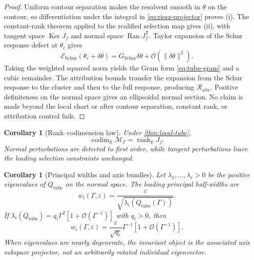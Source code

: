 \documentclass[11pt]{article}
\newtheorem{corollary}[theorem]{Corollary}
\theoremstyle{definition}
\theoremstyle{remark}
\DeclareMathOperator{\rank}{rank}
\DeclareMathOperator{\Ran}{Ran}
\DeclareMathOperator{\Ker}{Ker}
\newcommand{\eps}{\varepsilon}
\newcommand{\cM}{\mathcal M}
\newcommand{\cE}{\mathcal E}
\newcommand{\RR}{\mathbb R}
\begin{document}
\begin{proof}
Uniform contour separation makes the resolvent smooth in $\theta$ on the contour, so differentiation under the integral in \eqref{eq:riesz-projector} proves (i). The constant-rank theorem applied to the realified selection map gives (ii), with tangent space $\Ker J_f$ and normal space $\Ran J_f^{\mathsf T}$. Taylor expansion of the Schur response defect at $\theta_c$ gives
\begin{equation}
\cE_{\mathrm{Schur}}(\theta_c+\delta\theta)
=
G_{\mathrm{Schur}}\delta\theta
+\mathcal O(\|\delta\theta\|^2).
\end{equation}
Taking the weighted squared norm yields the Gram form \eqref{eq:tube-gram} and a cubic remainder. The attribution bounds transfer the expansion from the Schur response to the cluster and then to the full response, producing $\mathcal R_{\mathrm{attr}}$. Positive definiteness on the normal space gives an ellipsoidal normal section. No claim is made beyond the local chart or after contour separation, constant rank, or attribution control fails.
\end{proof}

\begin{corollary}[Rank--codimension law]\label{cor:rank-codim}
Under \cref{thm:local-tube},
\begin{equation}
\boxed{
\operatorname{codim}_{\RR}\cM_\Gamma
=
\rank_{\RR}J_f.
}
\label{eq:rank-codim}
\end{equation}
Normal perturbations are detected to first order, while tangent perturbations leave the leading selection constraints unchanged.
\end{corollary}

\begin{corollary}[Principal widths and axis bundles]\label{cor:tube-widths}
Let $\lambda_1,\ldots,\lambda_r>0$ be the positive eigenvalues of $Q_{\mathrm{tube}}$ on the normal space. The leading principal half-widths are
\begin{equation}
w_i(\Gamma,\eps)
=
\frac{\eps}{\sqrt{\lambda_i(Q_{\mathrm{tube}}(\Gamma))}}.
\label{eq:principal-widths}
\end{equation}
If $\lambda_i(Q_{\mathrm{tube}})=q_i\Gamma^2[1+\mathcal O(\Gamma^{-1})]$ with $q_i>0$, then
\begin{equation}
w_i(\Gamma,\eps)
=
\frac{\eps}{\sqrt{q_i}}\Gamma^{-1}
[1+\mathcal O(\Gamma^{-1})].
\label{eq:gamma-minus-one-width}
\end{equation}
When eigenvalues are nearly degenerate, the invariant object is the associated axis subspace projector, not an arbitrarily rotated individual eigenvector.
\end{corollary}
\end{document}
